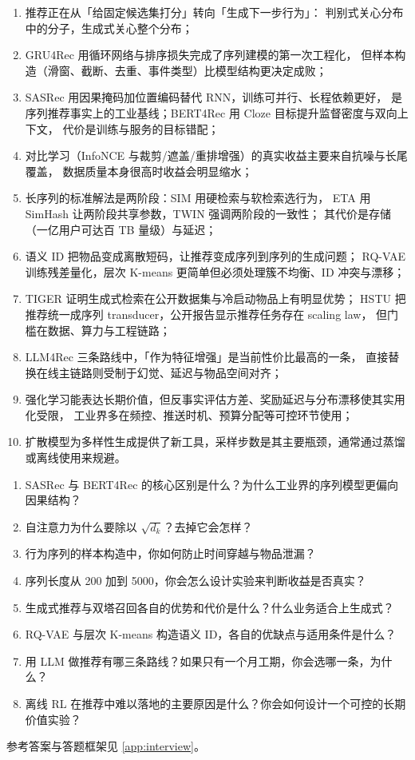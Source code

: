 \begin{keypoint}[本章要点回顾]
\begin{enumerate}
  \item 推荐正在从「给固定候选集打分」转向「生成下一步行为」：
        判别式关心分布中的分子，生成式关心整个分布；
  \item GRU4Rec 用循环网络与排序损失完成了序列建模的第一次工程化，
        但样本构造（滑窗、截断、去重、事件类型）比模型结构更决定成败；
  \item SASRec 用因果掩码加位置编码替代 RNN，训练可并行、长程依赖更好，
        是序列推荐事实上的工业基线；BERT4Rec 用 Cloze 目标提升监督密度与双向上下文，
        代价是训练与服务的目标错配；
  \item 对比学习（InfoNCE 与裁剪/遮盖/重排增强）的真实收益主要来自抗噪与长尾覆盖，
        数据质量本身很高时收益会明显缩水；
  \item 长序列的标准解法是两阶段：SIM 用硬检索与软检索选行为，
        ETA 用 SimHash 让两阶段共享参数，TWIN 强调两阶段的一致性；
        其代价是存储（一亿用户可达百 TB 量级）与延迟；
  \item 语义 ID 把物品变成离散短码，让推荐变成序列到序列的生成问题；
        RQ-VAE 训练残差量化，层次 K-means 更简单但必须处理簇不均衡、ID 冲突与漂移；
  \item TIGER 证明生成式检索在公开数据集与冷启动物品上有明显优势；
        HSTU 把推荐统一成序列 transducer，公开报告显示推荐任务存在 scaling law，
        但门槛在数据、算力与工程链路；
  \item LLM4Rec 三条路线中，「作为特征增强」是当前性价比最高的一条，
        直接替换在线主链路则受制于幻觉、延迟与物品空间对齐；
  \item 强化学习能表达长期价值，但反事实评估方差、奖励延迟与分布漂移使其实用化受限，
        工业界多在频控、推送时机、预算分配等可控环节使用；
  \item 扩散模型为多样性生成提供了新工具，采样步数是其主要瓶颈，通常通过蒸馏或离线使用来规避。
\end{enumerate}
\end{keypoint}

\begin{interview}[本章对应的面试题]
\begin{enumerate}
  \item SASRec 与 BERT4Rec 的核心区别是什么？为什么工业界的序列模型更偏向因果结构？
  \item 自注意力为什么要除以 $\sqrt{d_k}$？去掉它会怎样？
  \item 行为序列的样本构造中，你如何防止时间穿越与物品泄漏？
  \item 序列长度从 200 加到 5000，你会怎么设计实验来判断收益是否真实？
  \item 生成式推荐与双塔召回各自的优势和代价是什么？什么业务适合上生成式？
  \item RQ-VAE 与层次 K-means 构造语义 ID，各自的优缺点与适用条件是什么？
  \item 用 LLM 做推荐有哪三条路线？如果只有一个月工期，你会选哪一条，为什么？
  \item 离线 RL 在推荐中难以落地的主要原因是什么？你会如何设计一个可控的长期价值实验？
\end{enumerate}
参考答案与答题框架见 \cref{app:interview}。
\end{interview}

